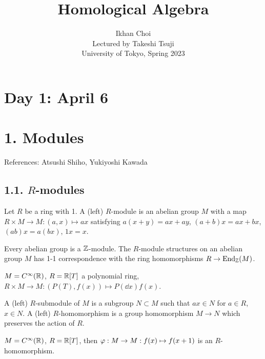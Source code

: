 \documentclass{../../../small}
\begin{document}
\title{Homological Algebra}
\author{Ikhan Choi\\Lectured by Takeshi Tsuji\\University of Tokyo, Spring 2023}
\maketitle
\tableofcontents

\newpage
\section{Day 1: April 6}

\section*{1. Modules}

References: Atsushi Shiho, Yukiyoshi Kawada

\subsection*{1.1. $R$-modules}
\begin{defn}
Let $R$ be a ring with 1.
A (left) $R$-module is an abelian group $M$ with a map $R\times M\to M:(a,x)\mapsto ax$ satisfying $a(x+y)=ax+ay$, $(a+b)x=ax+bx$, $(ab)x=a(bx)$, $1x=x$.
\end{defn}
\begin{ex}
\begin{parts}
\item Every abelian group is a $\mathbb{Z}$-module. The $R$-module structures on an abelian group $M$ has 1-1 correspondence with the ring homomorphisms $R\to\operatorname{End}_{\mathbb{Z}}(M)$.
\item $M=C^\infty(\mathbb{R})$, $R=\mathbb{R}[T]$ a polynomial ring, $R\times M\to M:(P(T),f(x))\mapsto P(\dd{x})f(x)$.
\end{parts}
\end{ex}

\begin{defn}
A (left) $R$-submodule of $M$ is a subgroup $N\subset M$ such that $ax\in N$ for $a\in R$, $x\in N$.
A (left) $R$-homomorphism is a group homomorphism $M\to N$ which preserves the action of $R$.
\end{defn}
\begin{ex}
\begin{parts}
\item $M=C^\infty(\mathbb{R})$, $R=\mathbb{R}[T]$, then $\varphi:M\to M:f(x)\mapsto f(x+1)$ is an $R$-homomorphism.
\end{parts}
\end{ex}
\end{document}

